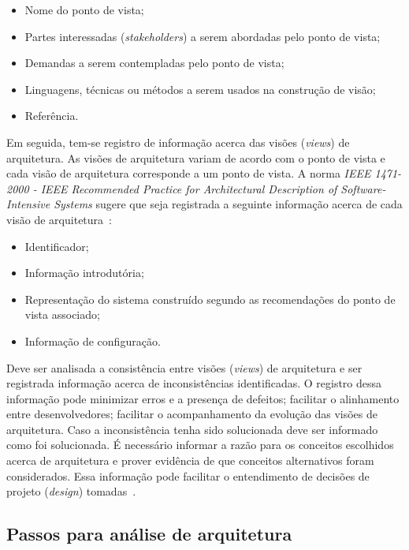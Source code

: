 \begin{itemize}
    \item Nome do ponto de vista;
    \item Partes interessadas (\emph{stakeholders}) a serem abordadas pelo ponto de vista;
    \item Demandas a serem contempladas pelo ponto de vista;
    \item Linguagens, técnicas ou métodos a serem usados na construção de visão;
    \item Referência.

\end{itemize}

Em seguida, tem-se registro de informação acerca das visões (\emph{views}) de arquitetura. As visões de arquitetura variam de acordo com o ponto de vista e cada visão de arquitetura corresponde a um ponto de vista. A norma \emph{ IEEE 1471-2000 - IEEE Recommended Practice for Architectural Description of Software-Intensive Systems} sugere que seja registrada a seguinte informação acerca de cada visão de arquitetura~\cite{ISO_1471}: 

\begin{itemize}
    \item Identificador;
    \item Informação introdutória;
    \item Representação do sistema construído segundo as recomendações do ponto de vista associado;
    \item Informação de configuração.

\end{itemize}

Deve ser analisada a consistência entre visões (\emph{views}) de arquitetura e ser registrada informação acerca de inconsistências identificadas. O registro dessa informação pode minimizar erros e a presença de defeitos; facilitar o alinhamento entre desenvolvedores; facilitar o acompanhamento da evolução das visões de arquitetura. Caso a inconsistência tenha sido solucionada deve ser informado como foi solucionada. É necessário informar a razão para os conceitos escolhidos acerca de arquitetura e prover evidência de que conceitos alternativos foram considerados. Essa informação pode facilitar o entendimento de decisões de projeto (\emph{design}) tomadas~\cite{ISO_1471}.

\subsection{Passos para análise de arquitetura}

